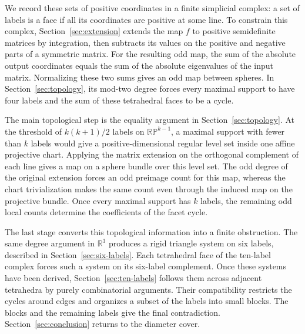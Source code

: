 We record these sets of positive coordinates in a finite simplicial
complex: a set of labels is a face if all its coordinates are positive
at some line. To constrain this complex, Section~\ref{sec:extension}
extends the map $f$ to positive semidefinite matrices by integration,
then subtracts its values on the positive and negative parts of a
symmetric matrix. For the resulting odd map, the sum of the absolute output coordinates
equals the sum of the absolute eigenvalues of the input matrix.
Normalizing these two sums gives an odd map between spheres. In Section~\ref{sec:topology}, its mod-two
degree forces every maximal support to have four labels and the sum of
these tetrahedral faces to be a cycle.

The main topological step is the equality argument in
Section~\ref{sec:topology}. At the threshold of $k(k+1)/2$ labels on
$\mathbb{RP}^{k-1}$, a maximal support with fewer than $k$ labels
would give a positive-dimensional regular level set inside one affine
projective chart. Applying the matrix extension on the orthogonal
complement of each line gives a map on a sphere bundle over this level
set. The odd degree of the original extension forces an odd preimage
count for this map, whereas the chart trivialization makes the same
count even through the induced map on the projective bundle. Once every maximal support has
$k$ labels, the remaining odd local counts determine the coefficients
of the facet cycle.

The last stage converts this topological information into a finite
obstruction. The same degree argument in $\mathbb R^3$ produces a rigid triangle system on six
labels, described in Section~\ref{sec:six-labels}. Each tetrahedral face
of the ten-label complex forces such a system on its six-label
complement. Once these systems have been derived,
Section~\ref{sec:ten-labels} follows them across adjacent tetrahedra by
purely combinatorial arguments. Their compatibility restricts the cycles
around edges and organizes a subset of the labels into small blocks.
The blocks and the remaining labels give the final contradiction.
Section~\ref{sec:conclusion} returns to the diameter cover.
